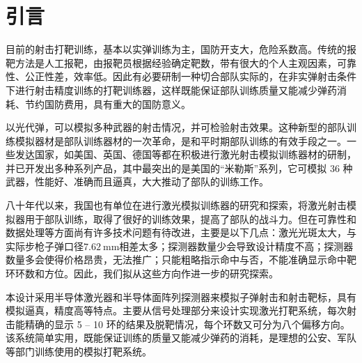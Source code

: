 \chapter{引言}

目前的射击打靶训练，基本以实弹训练为主，国防开支大，危险系数高。传统的报靶方法是人工报靶，由报靶员根据经验确定靶数，带有很大的个人主观因素，可靠性、公正性差，效率低。因此有必要研制一种切合部队实际的，在非实弹射击条件下进行射击精度训练的打靶训练器，这样既能保证部队训练质量又能减少弹药消耗、节约国防费用，具有重大的国防意义。

以光代弹，可以模拟多种武器的射击情况，并可检验射击效果。这种新型的部队训练模拟器材是部队训练器材的一次革命，是和平时期部队训练的有效手段之一。一些发达国家，如美国、英国、德国等都在积极进行激光射击模拟训练器材的研制，并已开发出多种系列产品，其中最突出的是美国的“米勒斯”系列，它可模拟 36 种武器，性能好、准确而且逼真，大大推动了部队的训练工作。

八十年代以来，我国也有单位在进行激光模拟训练器的研究和探索，将激光射击模拟器用于部队训练，取得了很好的训练效果，提高了部队的战斗力。但在可靠性和数据处理等方面尚有许多技术问题有待改进，主要是以下几点：激光光斑太大，与实际步枪子弹口径$\qty{7.62}\mm$相差太多；探测器数量少会导致设计精度不高；探测器数量多会使得价格昂贵，无法推广；只能粗略指示命中与否，不能准确显示命中靶环环数和方位。因此，我们拟从这些方向作进一步的研究探索。

本设计采用半导体激光器和半导体面阵列探测器来模拟子弹射击和射击靶标，具有模拟逼真，精度高等特点。主要从信号处理部分来设计实现激光打靶系统，每次射击能精确的显示 5 -- 10 环的结果及脱靶情况，每个环数又可分为八个偏移方向。该系统简单实用，既能保证训练的质量又能减少弹药的消耗，是理想的公安、军队等部门训练使用的模拟打靶系统。